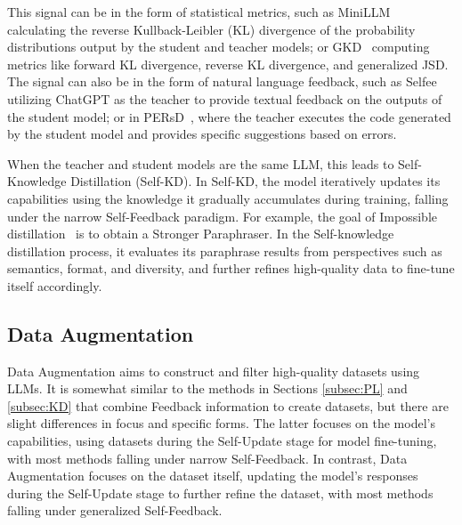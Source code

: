 \documentclass[lettersize,journal]{IEEEtran}
\begin{document}
This signal can be in the form of statistical metrics, such as MiniLLM~\cite{MiniLLM_24_ICLR_THU} calculating the reverse Kullback-Leibler (KL) divergence of the probability distributions output by the student and teacher models; or GKD~\cite{GKD_24_ICLR_Google} computing metrics like forward KL divergence, reverse KL divergence, and generalized JSD. The signal can also be in the form of natural language feedback, such as Selfee~\cite{Selfee_23_blog} utilizing ChatGPT as the teacher to provide textual feedback on the outputs of the student model; or in PERsD~\cite{PERsD_23_EMNLP_NTU}, where the teacher executes the code generated by the student model and provides specific suggestions based on errors.


When the teacher and student models are the same LLM, this leads to Self-Knowledge Distillation (Self-KD). In Self-KD, the model iteratively updates its capabilities using the knowledge it gradually accumulates during training, falling under the narrow Self-Feedback paradigm. For example, the goal of Impossible distillation~\cite{ImposDistill_23_arXiv_UoW} is to obtain a Stronger Paraphraser. In the Self-knowledge distillation process, it evaluates its paraphrase results from perspectives such as semantics, format, and diversity, and further refines high-quality data to fine-tune itself accordingly.



\subsection{Data Augmentation}


\noindent Data Augmentation aims to construct and filter high-quality datasets using LLMs. It is somewhat similar to the methods in Sections \ref{subsec:PL} and \ref{subsec:KD} that combine Feedback information to create datasets, but there are slight differences in focus and specific forms. The latter focuses on the model's capabilities, using datasets during the Self-Update stage for model fine-tuning, with most methods falling under narrow Self-Feedback. In contrast, Data Augmentation focuses on the dataset itself, updating the model's responses during the Self-Update stage to further refine the dataset, with most methods falling under generalized Self-Feedback.
\end{document}
